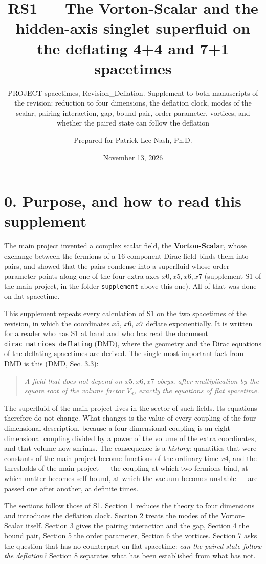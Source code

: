 \documentclass[
  10pt,
]{article}
\title{RS1 --- The Vorton-Scalar and the hidden-axis singlet superfluid
on the deflating 4+4 and 7+1 spacetimes}
\subtitle{PROJECT spacetimes, Revision\_Deflation. Supplement to both
manuscripts of the revision: reduction to four dimensions, the deflation
clock, modes of the scalar, pairing interaction, gap, bound pair, order
parameter, vortices, and whether the paired state can follow the
deflation}
\author{Prepared for Patrick Lee Nash, Ph.D.}
\date{November 13, 2026}
\begin{document}
\maketitle

\hypertarget{purpose-and-how-to-read-this-supplement}{%
\section{0. Purpose, and how to read this
supplement}\label{purpose-and-how-to-read-this-supplement}}

The main project invented a complex scalar field, the
\textbf{Vorton-Scalar}, whose exchange between the fermions of a
16-component Dirac field binds them into pairs, and showed that the
pairs condense into a superfluid whose order parameter points along one
of the four extra axes \(x0,x5,x6,x7\) (supplement S1 of the main
project, in the folder \texttt{supplement} above this one). All of that
was done on flat spacetime.

This supplement repeats every calculation of S1 on the two spacetimes of
the revision, in which the coordinates \(x5\), \(x6\), \(x7\) deflate
exponentially. It is written for a reader who has S1 at hand and who has
read the document \texttt{dirac\ matrices\ deflating} (DMD), where the
geometry and the Dirac equations of the deflating spacetimes are
derived. The single most important fact from DMD is this (DMD, Sec.
3.3):

\begin{quote}
\emph{A field that does not depend on \(x5,x6,x7\) obeys, after
multiplication by the square root of the volume factor \(V_d\), exactly
the equations of flat spacetime.}
\end{quote}

The superfluid of the main project lives in the sector of such fields.
Its equations therefore do not change. What changes is the value of
every coupling of the four-dimensional description, because a
four-dimensional coupling is an eight-dimensional coupling divided by a
power of the volume of the extra coordinates, and that volume now
shrinks. The consequence is a \emph{history}: quantities that were
constants of the main project become functions of the ordinary time
\(x4\), and the thresholds of the main project --- the coupling at which
two fermions bind, at which matter becomes self-bound, at which the
vacuum becomes unstable --- are passed one after another, at definite
times.

The sections follow those of S1. Section 1 reduces the theory to four
dimensions and introduces the deflation clock. Section 2 treats the
modes of the Vorton-Scalar itself. Section 3 gives the pairing
interaction and the gap, Section 4 the bound pair, Section 5 the order
parameter, Section 6 the vortices. Section 7 asks the question that has
no counterpart on flat spacetime: \emph{can the paired state follow the
deflation?} Section 8 separates what has been established from what has
not.
\end{document}
